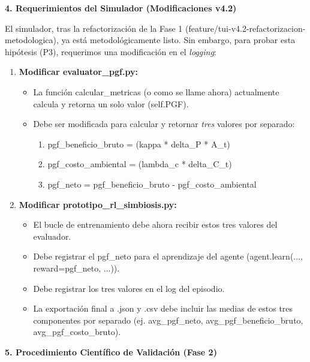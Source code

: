\textbf{4. Requerimientos del Simulador (Modificaciones v4.2)}

El simulador, tras la refactorización de la Fase 1
(feature/tui-v4.2-refactorizacion-metodologica), ya está
metodológicamente listo. Sin embargo, para probar esta hipótesis (P3),
requerimos una modificación en el \emph{logging}:

\begin{enumerate}
\def\labelenumi{\arabic{enumi}.}
\item
  \textbf{Modificar evaluator\_pgf.py:}

  \begin{itemize}
  \item
    La función calcular\_metricas (o como se llame ahora) actualmente
    calcula y retorna un solo valor (self.PGF).
  \item
    Debe ser modificada para calcular y retornar \emph{tres} valores por
    separado:

    \begin{enumerate}
    \def\labelenumii{\arabic{enumii}.}
    \item
      pgf\_beneficio\_bruto = (kappa * delta\_P * A\_t)
    \item
      pgf\_costo\_ambiental = (lambda\_c * delta\_C\_t)
    \item
      pgf\_neto = pgf\_beneficio\_bruto - pgf\_costo\_ambiental
    \end{enumerate}
  \end{itemize}
\item
  \textbf{Modificar prototipo\_rl\_simbiosis.py:}

  \begin{itemize}
  \item
    El bucle de entrenamiento debe ahora recibir estos tres valores del
    evaluador.
  \item
    Debe registrar el pgf\_neto para el aprendizaje del agente
    (agent.learn(..., reward=pgf\_neto, ...)).
  \item
    Debe registrar los tres valores en el log del episodio.
  \item
    La exportación final a .json y .csv debe incluir las medias de estos
    tres componentes por separado (ej. avg\_pgf\_neto,
    avg\_pgf\_beneficio\_bruto, avg\_pgf\_costo\_bruto).
  \end{itemize}
\end{enumerate}

\textbf{5. Procedimiento Científico de Validación (Fase 2)}

